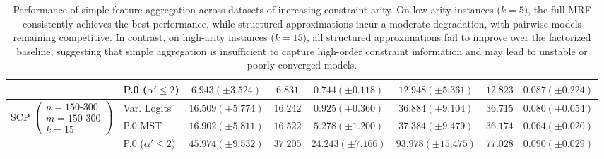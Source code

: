 \begin{table}[H]
{\begin{tabular}{llcccccc}
& P.0 ($\alpha' \leq 2$)
& $6.943 (\pm 3.524)$
& $6.831$
& $0.744 (\pm 0.118)$
& $12.948 (\pm 5.361)$
& $12.823$
& $0.087 (\pm 0.224)$ \\
\midrule

\multirow{3}{*}{SCP $\left(\begin{array}{l}n=150\text{-}300\\ m=150\text{-}300\\ k=15\end{array}\right)$}
& Var. Logits
& $\mathbf{16.509 (\pm 5.774)}$
& $\mathbf{16.242}$
& $\mathbf{0.925 (\pm 0.360)}$
& $\mathbf{36.884 (\pm 9.104)}$
& $36.715$
& $0.080 (\pm 0.054)$ \\
\cmidrule(lr){2-8}

& P.0 MST
& $16.902 (\pm 5.811)$
& $16.522$
& $5.278 (\pm 1.200)$
& $37.384 (\pm 9.479)$
& $\mathbf{36.174}$
& $\mathbf{0.064 (\pm 0.020)}$ \\

& P.0 ($\alpha' \leq 2$)
& $45.974 (\pm 9.532)$
& $37.205$
& $24.243 (\pm 7.166)$
& $93.978 (\pm 15.475)$
& $77.028$
& $0.090 (\pm 0.029)$ \\

\bottomrule
\end{tabular}}
\caption{
Performance of simple feature aggregation across datasets of increasing constraint arity. 
On low-arity instances ($k=5$), the full MRF consistently achieves the best performance, while structured approximations incur a moderate degradation, with pairwise models remaining competitive. 
In contrast, on high-arity instances ($k=15$), all structured approximations fail to improve over the factorized baseline, suggesting that simple aggregation is insufficient to capture high-order constraint information and may lead to unstable or poorly converged models.
}
\label{tab:chapter_5_proposal0_summary}
\end{table}